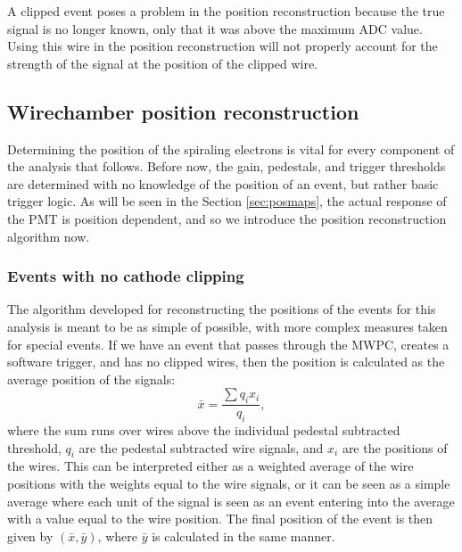 A clipped event poses a problem in the position reconstruction because the true signal
is no longer known, only that it was above the maximum ADC value. Using this wire in
the position reconstruction will not properly account for the strength of the
signal at the position of the clipped wire.

\subsection{Wirechamber position reconstruction}

Determining the position of the spiraling electrons is vital for every component of the analysis
that follows. Before now, the gain, pedestals, and trigger thresholds are determined with no
knowledge of the position of an event, but rather basic trigger logic. As will be seen in
the Section \ref{sec:posmaps}, the actual response of the PMT is position dependent, and so we introduce the
position reconstruction algorithm now.

\subsubsection{Events with no cathode clipping}

The algorithm developed for reconstructing the positions of the events for this analysis
is meant to be as simple of possible, with more complex measures taken for special events.
If we have an event that passes through the MWPC, creates a software trigger, and has no
clipped wires, then the position is calculated as the average position of the signals:
%
\begin{equation}
  \bar{x} = \frac{\sum q_i x_i}{q_i},
\end{equation}
%
where the sum runs over wires above the individual pedestal subtracted threshold, $q_i$ are the
pedestal subtracted wire signals, and $x_i$ are the positions of the wires.  This can
be interpreted either as a weighted average of the wire positions with the weights equal to
the wire signals, or it can be seen as a simple average where each unit of the signal is seen
as an event entering into the average with a value equal to the wire position. The final position
of the event is then given by $(\bar{x}, \bar{y})$, where $\bar{y}$ is calculated in the same manner.


